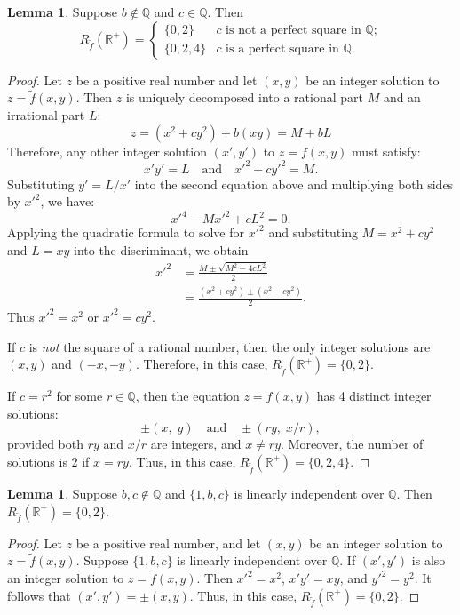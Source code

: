 \documentclass[11pt]{amsart}
\theoremstyle{definition}
\newtheorem{lemma}[theorem]{Lemma}
\begin{document}
    \begin{lemma}\label{lm:b}
Suppose $b\not\in\mathbb{Q}$ and $c\in\mathbb{Q}$.  Then
\[
R_{\tilde{f}}(\mathbb{R^{+}})=\begin{cases} \{0, 2\} & \text{$c$ is not a perfect square in $\mathbb{Q}$;}\\
\{0, 2, 4\} &\text{$c$ is a perfect square in $\mathbb{Q}$.}
\end{cases}
\]
\end{lemma}
\begin{proof} 	Let $z$ be a positive real number and let $(x, y)$ be an integer solution to $z=\tilde f(x, y)$. Then $z$ is uniquely decomposed into a rational part $M$ and an irrational part $L$:
	\[ z = (x^2 + cy^2) + b(xy)=M+bL \]
Therefore, any other integer solution $(x', y')$ to $z=f(x, y)$ must satisfy:
	\[x'y' = L \quad\text{and}\quad x'^2 + cy'^2 =M.\]
Substituting $y' = L/x'$ into the second equation above and multiplying both sides by $x'^2$, we have:
	\[ x'^4 - Mx'^2 + cL^2 = 0. \]
Applying the quadratic formula to solve for $x'^2$ and substituting $M = x^2 + cy^2$ and 
$L = xy$ into the discriminant, we obtain
\begin{align*}
 x'^2 &= \frac{M \pm \sqrt{M^2 - 4cL^2}}{2} \\
	&= \frac{(x^2 + cy^2) \pm (x^2 - cy^2)}{2}.
\end{align*}
Thus  $x'^2 = x^2$ or $x'^2 = cy^2$.

If $c$ is {\it not} the square of a rational number, then the only integer solutions are $(x, y)$ and $(-x, -y)$.  
Therefore, in this case, $R_{\tilde{f}}(\mathbb{R^{+}})=\{0, 2\}$.
	
If $c = r^2$ for some $r \in \mathbb{Q}$,  then the equation $z=f(x, y)$ has 4 distinct integer
solutions:
\[
\pm (x,\; y) \quad \text{and}\quad \pm (ry, \; x/r),
\]
provided both $ry$ and $x/r$ are integers, and $x\not=ry$.  Moreover,  the number of solutions is 2 if $x=ry$. 
Thus, in this case, $R_{\tilde{f}}(\mathbb{R}^+)=\{0, 2, 4\}$. \end{proof}

\begin{lemma}\label{lm:c}
Suppose $b, c\not\in\mathbb{Q}$ and $\{1, b, c\}$ is linearly independent over  $\mathbb{Q}$. Then $R_{\tilde{f}}(\mathbb{R^{+}})=\{0, 2\}$.
\end{lemma}

\begin{proof} Let $z$ be a positive real number, and let $(x, y)$ be an integer solution to $z=\tilde f(x, y)$.
Suppose $\{1, b, c\}$ is linearly independent over $\mathbb{Q}$. If $(x', y')$ is also an integer solution
to $z=\tilde f(x, y)$. Then $x'^2=x^2$, $x'y'=xy$, and $y'^2=y^2$. It follows that $(x', y')=\pm (x, y)$. Thus, in this case, $R_{\tilde{f}}(\mathbb{R^{+}})=\{0, 2\}$. 
\end{proof}
\end{document}
